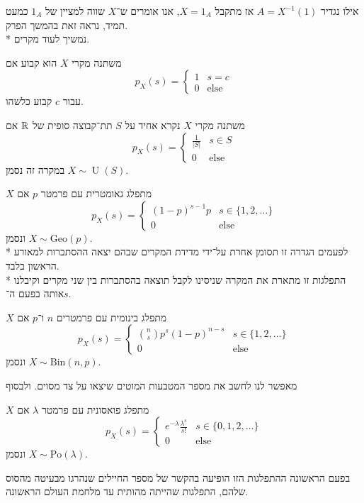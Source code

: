 אילו נגדיר $A = X^{-1}(1)$ אז מתקבל $X = 1_A$, אנו אומרים ש־$X$ שווה למציין של $1_A$ כמעט תמיד, נראה זאת בהמשך הפרק. \\*
נמשיך לעוד מקרים.
\begin{definition}
	משתנה מקרי $X$ הוא קבוע אם
	\[
		p_X(s) = \begin{cases}
			1 & s = c \\
			0 & \text{else}
		\end{cases}
	\]
	עבור $c$ קבוע כלשהו.
\end{definition}
\begin{definition}
	משתנה מקרי $X$ נקרא אחיד על $S$ תת־קבוצה סופית של $\mathbb{R}$ אם
	\[
		p_X(s) = \begin{cases}
			\frac{1}{|S|} & s \in S \\
			0 & \text{else}
		\end{cases}
	\]
	במקרה זה נסמן $X \sim \operatorname{U}(S)$.
\end{definition}
\begin{definition}\label{geometric_distribution}
	$X$ מתפלג גאומטרית עם פרמטר $p$ אם
	\[
		p_X(s) = \begin{cases}
			{(1 - p)}^{s - 1} p & s \in \{1, 2, \dots \} \\
			0 & \text{else}
		\end{cases}
	\]
	ונסמן $X \sim \text{Geo}(p)$. \\*
	לפעמים הגדרה זו תסומן אחרת על־ידי מדידת המקרים שבהם יצאה ההסתברות למאורע הראשון בלבד. \\*
	התפלגות זו מתארת את המקרה שניסינו לקבל תוצאה בהסתברות בין שני מקרים וקיבלנו אותה בפעם ה־$s$.
\end{definition}
\begin{definition}\label{binominal_distribution}
	$X$ מתפלג בינומית עם פרמטרים $n$ ו־$p$ אם
	\[
		p_X(s) = \begin{cases}
			\binom{n}{s} p^s {(1 - p)}^{n - s} & s \in \{1, 2, \dots\} \\
			0 & \text{else}
		\end{cases}
	\]
	ונסמן $X \sim \text{Bin}(n, p)$.
\end{definition}
מאפשר לנו לחשב את מספר המטבעות המוטים שיצאו על צד מסוים.
ולבסוף
\begin{definition}\label{poasson_distribution}
	$X$ מתפלג פואסונית עם פרמטר $\lambda$ אם
	\[
		p_X(s) = \begin{cases}
			e^{-\lambda} \frac{\lambda^s}{s!} & s \in \{0, 1, 2, \dots\} \\
			0 & \text{else}
		\end{cases}
	\]
	ונסמן $X \sim \text{Po}(\lambda)$.
\end{definition}
בפעם הראשונה ההתפלגות הזו הופיעה בהקשר של מספר החיילים שנהרגו מבעיטה מהסוס שלהם, התפלגות שהייתה מהותית עד מלחמת העולם הראשונה.

